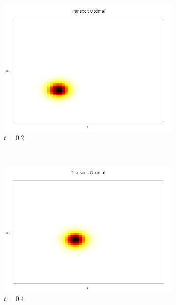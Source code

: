 \documentclass[a4paper,12pt]{article}
\begin{document}
\begin{figure}[!h]
	\begin{subfigure}[b]{0.22\linewidth}
	\includegraphics[width=\textwidth]{img/2DGaussian/C_00010.png}
	\caption{$t=0.2$}
	\end{subfigure}
	~
	\begin{subfigure}[b]{0.22\linewidth}
	\includegraphics[width=\textwidth]{img/2DGaussian/C_00020.png}
	\caption{$t=0.4$}
	\end{subfigure}
	~
	\begin{subfigure}[b]{0.22\linewidth}

\end{subfigure}
\end{figure}
\end{document}

